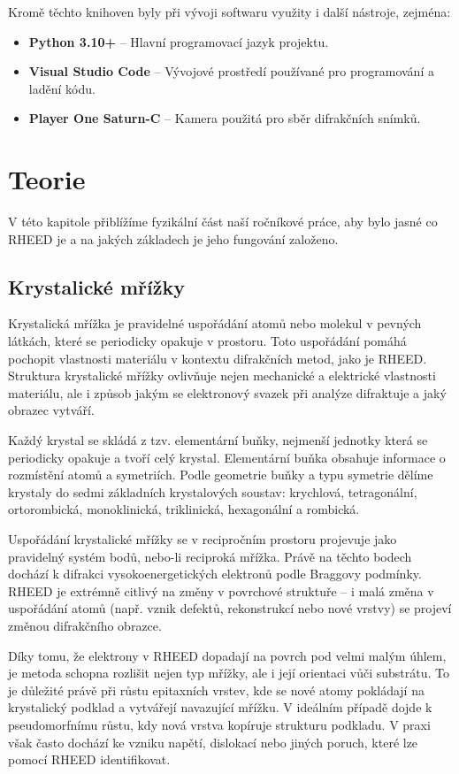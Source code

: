\documentclass[a4paper,11pt]{article}
\begin{document}
Kromě těchto knihoven byly při vývoji softwaru využity i další nástroje, zejména:

\begin{itemize}
    \item \textbf{Python 3.10+} – Hlavní programovací jazyk projektu.
    \item \textbf{Visual Studio Code} – Vývojové prostředí používané pro programování a ladění kódu.
    \item \textbf{Player One Saturn-C} – Kamera použitá pro sběr difrakčních snímků.
\end{itemize}

\newpage

\section{Teorie}
V této kapitole přiblížíme fyzikální část naší ročníkové práce, aby bylo jasné co RHEED je a na jakých základech je jeho fungování založeno.

\subsection{Krystalické mřížky}
Krystalická mřížka je pravidelné uspořádání atomů nebo molekul v pevných látkách, které se periodicky opakuje v prostoru. Toto uspořádání pomáhá pochopit vlastnosti materiálu v kontextu difrakčních metod, jako je RHEED. Struktura krystalické mřížky ovlivňuje nejen mechanické a elektrické vlastnosti materiálu, ale i způsob jakým se elektronový svazek při analýze difraktuje a jaký obrazec vytváří.

Každý krystal se skládá z tzv. elementární buňky, nejmenší jednotky která se periodicky opakuje a tvoří celý krystal. Elementární buňka obsahuje informace o rozmístění atomů a symetriích. Podle geometrie buňky a typu symetrie dělíme krystaly do sedmi základních krystalových soustav: krychlová, tetragonální, ortorombická, monoklinická, triklinická, hexagonální a rombická.

Uspořádání krystalické mřížky se v recipročním prostoru projevuje jako pravidelný systém bodů, nebo-li reciproká mřížka. Právě na těchto bodech dochází k difrakci vysokoenergetických elektronů podle Braggovy podmínky. RHEED je extrémně citlivý na změny v povrchové struktuře – i malá změna v uspořádání atomů (např. vznik defektů, rekonstrukcí nebo nové vrstvy) se projeví změnou difrakčního obrazce.

Díky tomu, že elektrony v RHEED dopadají na povrch pod velmi malým úhlem, je metoda schopna rozlišit nejen typ mřížky, ale i její orientaci vůči substrátu. To je důležité právě při růstu epitaxních vrstev, kde se nové atomy pokládají na krystalický podklad a vytvářejí navazující mřížku. V ideálním případě dojde k  pseudomorfnímu růstu, kdy nová vrstva kopíruje strukturu podkladu. V praxi však často dochází ke vzniku napětí, dislokací nebo jiných poruch, které lze pomocí RHEED identifikovat.\cite{Crystal}
\newpage
\end{document}
